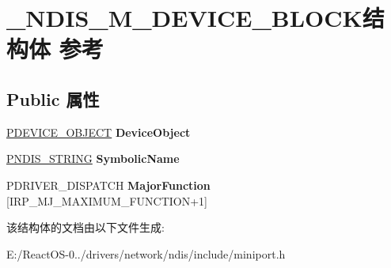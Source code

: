 \hypertarget{struct___n_d_i_s___m___d_e_v_i_c_e___b_l_o_c_k}{}\section{\+\_\+\+N\+D\+I\+S\+\_\+\+M\+\_\+\+D\+E\+V\+I\+C\+E\+\_\+\+B\+L\+O\+C\+K结构体 参考}
\label{struct___n_d_i_s___m___d_e_v_i_c_e___b_l_o_c_k}
\subsection*{Public 属性}
\begin{DoxyCompactItemize}
\item 
\mbox{\label{struct___n_d_i_s___m___d_e_v_i_c_e___b_l_o_c_k_a0a7bcd89d121015214c9867d400e8b1a}} 
\hyperlink{struct___d_e_v_i_c_e___o_b_j_e_c_t}{P\+D\+E\+V\+I\+C\+E\+\_\+\+O\+B\+J\+E\+CT} {\bfseries Device\+Object}
\item 
\mbox{\label{struct___n_d_i_s___m___d_e_v_i_c_e___b_l_o_c_k_aa2c966da7ef92751a031e27863853ceb}} 
\hyperlink{struct___u_n_i_c_o_d_e___s_t_r_i_n_g}{P\+N\+D\+I\+S\+\_\+\+S\+T\+R\+I\+NG} {\bfseries Symbolic\+Name}
\item 
\mbox{\label{struct___n_d_i_s___m___d_e_v_i_c_e___b_l_o_c_k_a30e9a23b58cdf8fdfd2eb7aef3a2e323}} 
P\+D\+R\+I\+V\+E\+R\+\_\+\+D\+I\+S\+P\+A\+T\+CH {\bfseries Major\+Function} \mbox{[}I\+R\+P\+\_\+\+M\+J\+\_\+\+M\+A\+X\+I\+M\+U\+M\+\_\+\+F\+U\+N\+C\+T\+I\+ON+1\mbox{]}
\end{DoxyCompactItemize}


该结构体的文档由以下文件生成\+:\begin{DoxyCompactItemize}
\item 
E\+:/\+React\+O\+S-\/0../drivers/network/ndis/include/miniport.\+h\end{DoxyCompactItemize}
